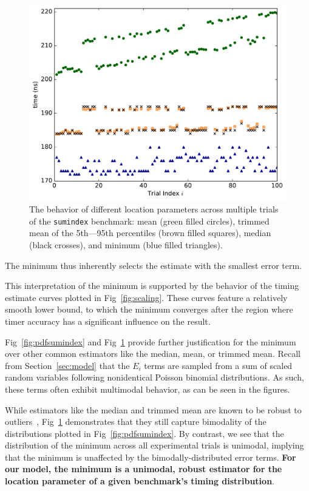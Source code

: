 \documentclass[conference]{IEEEtran}
\begin{document}
\begin{figure}[H]
\centering
\includegraphics[width=\columnwidth]{figures/fig3/location_estimators_sumindex}
\caption{The behavior of different location parameters across multiple trials of
the \lstinline|sumindex| benchmark: mean (green filled circles), trimmed mean of
the 5th---95th percentiles (brown filled squares), median (black crosses), and
minimum (blue filled triangles).}
\label{fig:locationmeasures}
\end{figure}

The minimum thus inherently selects the estimate with the smallest error term.

This interpretation of the minimum is supported by the behavior of the timing estimate
curves plotted in Fig~\ref{fig:scaling}. These curves feature a relatively smooth lower
bound, to which the minimum converges after the region where timer accuracy has a
significant influence on the result.

Fig~\ref{fig:pdfsumindex} and Fig~\ref{fig:locationmeasures} provide further justification
for the minimum over other common estimators like the median, mean, or trimmed mean. Recall
from Section~\ref{sec:model} that the $E_i$ terms are sampled from a sum of scaled random
variables following nonidentical Poisson binomial distributions. As such, these terms often
exhibit multimodal behavior, as can be seen in the figures.

While estimators like the median and trimmed mean are known to be robust to
outliers~\cite{Maronna2006}, Fig~\ref{fig:locationmeasures} demonstrates that they still
capture bimodality of the distributions plotted in Fig~\ref{fig:pdfsumindex}. By contrast,
we see that the distribution of the minimum across all experimental trials is unimodal,
implying that the minimum is unaffected by the bimodally-distributed error terms.
\textbf{For our model, the minimum is a unimodal, robust estimator for the location
parameter of a given benchmark's timing distribution}.
\end{document}
